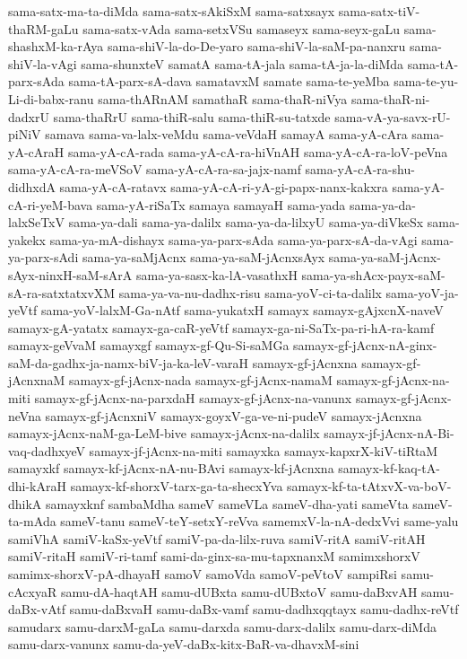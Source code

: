 {sama-satx-ma-ta-diMda
sama-satx-sAkiSxM
sama-satxsayx
sama-satx-tiV-thaRM-gaLu
sama-satx-vAda
sama-setxVSu
samaseyx
sama-seyx-gaLu
sama-shashxM-ka-rAya
sama-shiV-la-do-De-yaro
sama-shiV-la-saM-pa-nanxru
sama-shiV-la-vAgi
sama-shunxteV
samatA
sama-tA-jala
sama-tA-ja-la-diMda
sama-tA-parx-sAda
sama-tA-parx-sA-dava
samatavxM
samate
sama-te-yeMba
sama-te-yu-Li-di-babx-ranu
sama-thARnAM
samathaR
sama-thaR-niVya
sama-thaR-ni-dadxrU
sama-thaRrU
sama-thiR-salu
sama-thiR-su-tatxde
sama-vA-ya-savx-rU-piNiV
samava
sama-va-lalx-veMdu
sama-veVdaH
samayA
sama-yA-cAra
sama-yA-cAraH
sama-yA-cA-rada
sama-yA-cA-ra-hiVnAH
sama-yA-cA-ra-loV-peVna
sama-yA-cA-ra-meVSoV
sama-yA-cA-ra-sa-jajx-namf
sama-yA-cA-ra-shu-didhxdA
sama-yA-cA-ratavx
sama-yA-cA-ri-yA-gi-papx-nanx-kakxra
sama-yA-cA-ri-yeM-bava
sama-yA-riSaTx
samaya
samayaH
sama-yada
sama-ya-da-lalxSeTxV
sama-ya-dali
sama-ya-dalilx
sama-ya-da-lilxyU
sama-ya-diVkeSx
sama-yakekx
sama-ya-mA-dishayx
sama-ya-parx-sAda
sama-ya-parx-sA-da-vAgi
sama-ya-parx-sAdi
sama-ya-saMjAcnx
sama-ya-saM-jAcnxsAyx
sama-ya-saM-jAcnx-sAyx-ninxH-saM-sArA
sama-ya-sasx-ka-lA-vasathxH
sama-ya-shAcx-payx-saM-sA-ra-satxtatxvXM
sama-ya-va-nu-dadhx-risu
sama-yoV-ci-ta-dalilx
sama-yoV-ja-yeVtf
sama-yoV-lalxM-Ga-nAtf
sama-yukatxH
samayx
samayx-gAjxcnX-naveV
samayx-gA-yatatx
samayx-ga-caR-yeVtf
samayx-ga-ni-SaTx-pa-ri-hA-ra-kamf
samayx-geVvaM
samayxgf
samayx-gf-Qu-Si-saMGa
samayx-gf-jAcnx-nA-ginx-saM-da-gadhx-ja-namx-biV-ja-ka-leV-varaH
samayx-gf-jAcnxna
samayx-gf-jAcnxnaM
samayx-gf-jAcnx-nada
samayx-gf-jAcnx-namaM
samayx-gf-jAcnx-na-miti
samayx-gf-jAcnx-na-parxdaH
samayx-gf-jAcnx-na-vanunx
samayx-gf-jAcnx-neVna
samayx-gf-jAcnxniV
samayx-goyxV-ga-ve-ni-pudeV
samayx-jAcnxna
samayx-jAcnx-naM-ga-LeM-bive
samayx-jAcnx-na-dalilx
samayx-jf-jAcnx-nA-Bi-vaq-dadhxyeV
samayx-jf-jAcnx-na-miti
samayxka
samayx-kapxrX-kiV-tiRtaM
samayxkf
samayx-kf-jAcnx-nA-nu-BAvi
samayx-kf-jAcnxna
samayx-kf-kaq-tA-dhi-kAraH
samayx-kf-shorxV-tarx-ga-ta-shecxYva
samayx-kf-ta-tAtxvX-va-boV-dhikA
samayxknf
sambaMdha
sameV
sameVLa
sameV-dha-yati
sameVta
sameV-ta-mAda
sameV-tanu
sameV-teY-setxY-reVva
samemxV-la-nA-dedxVvi
same-yalu
samiVhA
samiV-kaSx-yeVtf
samiV-pa-da-lilx-ruva
samiV-ritA
samiV-ritAH
samiV-ritaH
samiV-ri-tamf
sami-da-ginx-sa-mu-tapxnanxM
samimxshorxV
samimx-shorxV-pA-dhayaH
samoV
samoVda
samoV-peVtoV
sampiRsi
samu-cAcxyaR
samu-dA-haqtAH
samu-dUBxta
samu-dUBxtoV
samu-daBxvAH
samu-daBx-vAtf
samu-daBxvaH
samu-daBx-vamf
samu-dadhxqqtayx
samu-dadhx-reVtf
samudarx
samu-darxM-gaLa
samu-darxda
samu-darx-dalilx
samu-darx-diMda
samu-darx-vanunx
samu-da-yeV-daBx-kitx-BaR-va-dhavxM-sini
}
